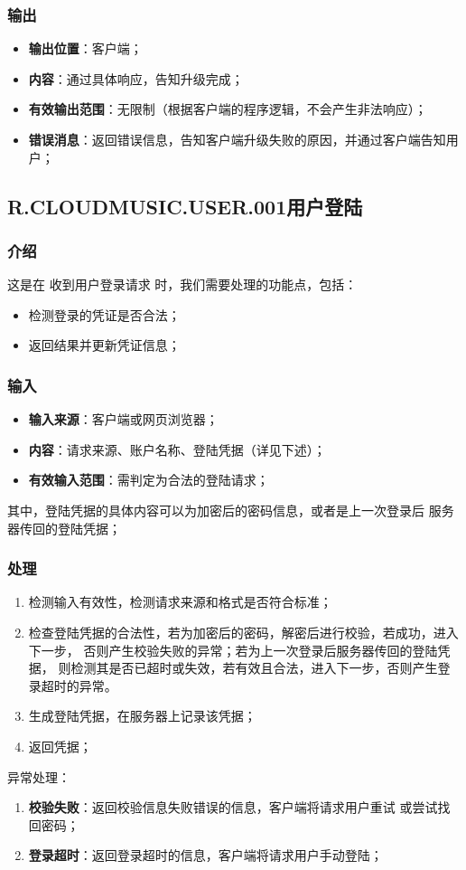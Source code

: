 \subsubsection{输出}
\begin{itemize}
	\item \textbf{输出位置}：客户端；
	\item \textbf{内容}：通过具体响应，告知升级完成；
	\item \textbf{有效输出范围}：无限制（根据客户端的程序逻辑，不会产生非法响应）；
	\item \textbf{错误消息}：返回错误信息，告知客户端升级失败的原因，并通过客户端告知用户；
\end{itemize}

\subsection{R.CLOUDMUSIC.USER.001用户登陆}
\subsubsection{介绍}
	这是在 收到用户登录请求 时，我们需要处理的功能点，包括：
	\begin{itemize}
		\item 检测登录的凭证是否合法；
		\item 返回结果并更新凭证信息；
	\end{itemize}
\subsubsection{输入}
	\begin{itemize}
		\item \textbf{输入来源}：客户端或网页浏览器；
		\item \textbf{内容}：请求来源、账户名称、登陆凭据（详见下述）；
		\item \textbf{有效输入范围}：需判定为合法的登陆请求；
	\end{itemize}
	\noindent 其中，登陆凭据的具体内容可以为加密后的密码信息，或者是上一次登录后
		服务器传回的登陆凭据；
\subsubsection{处理}
	\begin{enumerate}
		\item 检测输入有效性，检测请求来源和格式是否符合标准；
		\item 检查登陆凭据的合法性，若为加密后的密码，解密后进行校验，若成功，进入下一步，
			否则产生校验失败的异常；若为上一次登录后服务器传回的登陆凭据，
			则检测其是否已超时或失效，若有效且合法，进入下一步，否则产生登录超时的异常。
		\item 生成登陆凭据，在服务器上记录该凭据；
		\item 返回凭据；
	\end{enumerate}
	\noindent 异常处理：
	\begin{enumerate}
		\item \textbf{校验失败}：返回校验信息失败错误的信息，客户端将请求用户重试
			或尝试找回密码；
		\item \textbf{登录超时}：返回登录超时的信息，客户端将请求用户手动登陆；
	\end{enumerate}

